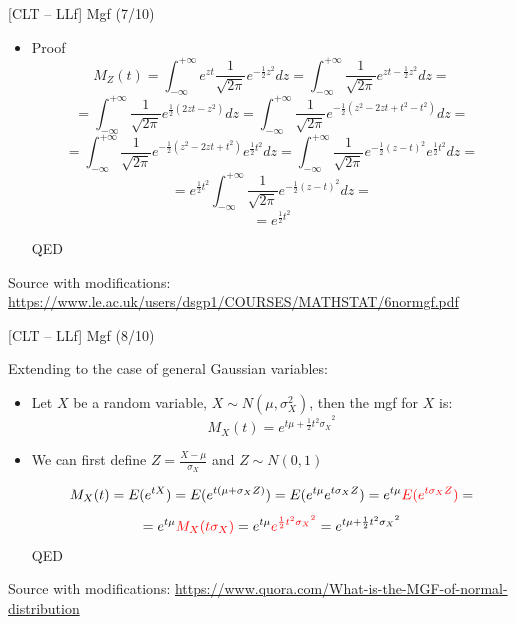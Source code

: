 \documentclass{beamer}
\begin{document}
\begin{frame}
{\centerline{[CLT -- LLf] Mgf (7/10)}}

\begin{itemize}
\item Proof
$$M_Z(t) = \int_{-\infty}^{+ \infty} e^{zt} \frac{1}{\sqrt{2\pi}}e^{-\frac{1}{2}z^2}dz = 
\int_{-\infty}^{+ \infty} \frac{1}{\sqrt{2\pi}} e^{zt-\frac{1}{2}z^2}dz =$$
$$ = \int_{-\infty}^{+ \infty} \frac{1}{\sqrt{2\pi}} e^{\frac{1}{2}(2zt-z^2)}dz = \int_{-\infty}^{+ \infty} \frac{1}{\sqrt{2\pi}} e^{-\frac{1}{2}(z^2 - 2zt +t^2 - t^2)}dz =$$
$$ = \int_{-\infty}^{+ \infty} \frac{1}{\sqrt{2\pi}} e^{-\frac{1}{2}(z^2 - 2zt +t^2 )}e^{\frac{1}{2}t^2}dz
= \int_{-\infty}^{+ \infty}\frac{1}{\sqrt{2\pi}} e^{-\frac{1}{2}(z - t )^2}e^{\frac{1}{2}t^2}dz =$$
$$ =  e^{\frac{1}{2}t^2} \int_{-\infty}^{+ \infty}\frac{1}{\sqrt{2\pi}} e^{-\frac{1}{2}(z - t )^2}dz = $$
$$ = e^{\frac{1}{2}t^2} $$

QED
\end{itemize}

\begin{center}
\tiny 
Source with modifications: \url{https://www.le.ac.uk/users/dsgp1/COURSES/MATHSTAT/6normgf.pdf}
\end{center}
\end{frame}


\begin{frame}
{\centerline{[CLT -- LLf] Mgf (8/10)}}
Extending to the case of general Gaussian variables:
\begin{itemize}
\item Let $X$ be a random variable, $  X \sim N(\mu,\sigma_X^2)  $, then the mgf for $X$ is:
$$M_X(t) = e^{t\mu + \frac{1}{2}{t^2\sigma_X}^2}$$

\item We can first define $Z = \frac{X - \mu}{ \sigma_X}$ and $  Z \sim N(0,1) $

$$M_X(t) = E(e^{tX}) = E(e^{t(\mu + \sigma_XZ)}) =  E(e^{t\mu} e^{t\sigma_XZ}) = e^{t\mu} \textcolor{red}{E(e^{t\sigma_XZ})} =$$
$$ = e^{t\mu} \textcolor{red}{M_X(t\sigma_X)} =  e^{t\mu} \textcolor{red}{e^{\frac{1}{2}{t^2\sigma_X}^2}}= e^{t\mu + \frac{1}{2}{t^2\sigma_X}^2}$$
QED
\end{itemize}

\begin{center}
\tiny 
Source with modifications: \url{https://www.quora.com/What-is-the-MGF-of-normal-distribution}
\end{center}
\end{frame}
\end{document}
